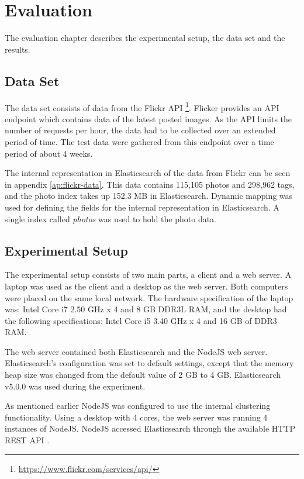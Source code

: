 \chapter{Evaluation}
\label{ch:evaluation}
The evaluation chapter describes the experimental setup, the data set and the results.

\section{Data Set}
\label{sec:dataset}
The data set consists of data from the Flickr API \footnote{\url{https://www.flickr.com/services/api/}}.
Flicker provides an API endpoint which contains data of the latest posted images.
As the API limits the number of requests per hour, the data had to be collected over an extended period of time.
The test data were gathered from this endpoint over a time period of about 4 weeks.

The internal representation in Elasticsearch of the data from Flickr can be seen in appendix \ref{ap:flickr-data}.
This data contains 115,105 photos and 298,962 tags, and the photo index takes up 152.3 MB in Elasticsearch.
Dynamic mapping was used for defining the fields for the internal representation in Elasticsearch.
A single index called \textit{photos} was used to hold the photo data.

\section{Experimental Setup}
The experimental setup consists of two main parts, a client and a web server.
A laptop was used as the client and a desktop as the web server.
Both computers were placed on the same local network.
The hardware specification of the laptop was: Intel Core i7 2.50 GHz x 4 and 8 GB DDR3L RAM,
and the desktop had the following specifications: Intel Core i5 3.40 GHz x 4 and 16 GB of DDR3 RAM.

The web server contained both Elasticsearch and the NodeJS web server.
Elasticsearch's configuration was set to default settings,
except that the memory heap size was changed from the default value of 2 GB to 4 GB.
Elasticsearch v5.0.0 was used during the experiment.

As mentioned earlier NodeJS was configured to use the internal clustering functionality.
Using a desktop with 4 cores, the web server was running 4 instances of NodeJS.
NodeJS accessed Elasticsearch through the available HTTP REST API \cite{elasticsearch-rest-api}.

